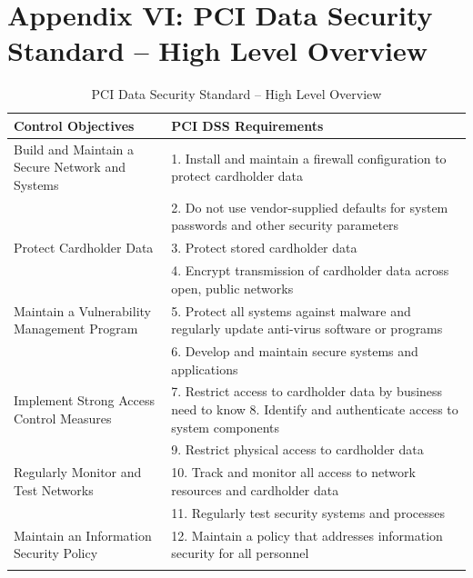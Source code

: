 \documentclass{article}
\begin{document}
\newpage
\section{Appendix VI: PCI Data Security Standard -- High Level Overview}
\begin{table}[h]
    \begin{tabularx}{\textwidth}{p{4.2cm} X}
        Control Objectives & PCI DSS Requirements\\
        \hline
        Build and Maintain a Secure Network and Systems & 1. Install and maintain a firewall configuration to protect cardholder data \\
            & 2. Do not use vendor-supplied defaults for system passwords and other security parameters \\
        Protect Cardholder Data & 3. Protect stored cardholder data \\
            & 4. Encrypt transmission of cardholder data across open, public networks \\
        Maintain a Vulnerability Management Program & 5. Protect all systems against malware and regularly update anti-virus software or programs \\
            & 6. Develop and maintain secure systems and applications \\
        Implement Strong Access Control Measures & 7. Restrict access to cardholder data by business need to know 8. Identify and authenticate access to system components \\
            & 9. Restrict physical access to cardholder data \\
        Regularly Monitor and Test Networks & 10. Track and monitor all access to network resources and cardholder data \\
            & 11. Regularly test security systems and processes \\
        Maintain an Information Security Policy & 12. Maintain a policy that addresses information security for all personnel \\
    \caption{PCI Data Security Standard -- High Level Overview \citep{pci_security_standards_council_payment_2016}}
    \end{tabularx}
    \label{table:pci_security_standards_council_payment_2016}
\end{table}

\newpage
\printglossaries

\newpage


\end{document}
